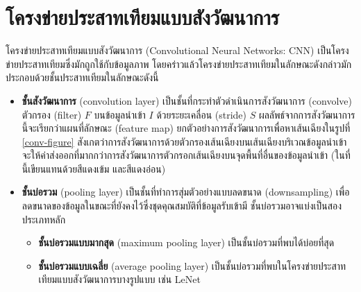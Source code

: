 \documentclass{cpereport}
\begin{document}
\section{โครงข่ายประสาทเทียมแบบสังวัฒนาการ}

โครงข่ายประสาทเทียมแบบสังวัฒนาการ (Convolutional Neural Networks: CNN) \cite{lecun-1998} เป็นโครงข่ายประสาทเทียมซึ่งมักถูกใช้กับข้อมูลภาพ \cite{Krizhevsky-2012} โดยคร่าวแล้วโครงข่ายประสาทเทียมในลักษณะดังกล่าวมักประกอบด้วยชั้นประสาทเทียมในลักษณะดังนี้

\begin{itemize}
    \item \textbf{ชั้นสังวัฒนาการ} (convolution layer) เป็นชั้นที่กระทำตัวดำเนินการสังวัฒนาการ (convolve) ตัวกรอง (filter) $F$ บนข้อมูลนำเข้า $I$ ด้วยระยะเคลื่อน (stride) $S$ ผลลัพธ์จากการสังวัฒนาการนี้จะเรียกว่าแผนที่ลักษณะ (feature map) ยกตัวอย่างการสังวัฒนาการเพื่อหาเส้นเฉียงในรูปที่ \ref{conv-figure} สังเกตว่าการสังวัฒนาการด้วยตัวกรองเส้นเฉียงบนเส้นเฉียงบริเวณข้อมูลนำเข้า จะให้ค่าส่งออกที่มากกว่าการสังวัฒนาการตัวกรอกเส้นเฉียงบนจุดพื้นที่อื่นของข้อมูลนำเข้า (ในที่นี้เขียนแทนด้วยสีแดงเข้ม และสีแดงอ่อน)
    \item \textbf{ชั้นบ่อรวม} (pooling layer)
    เป็นชั้นที่ทำการสุ่มตัวอย่างแบบลดขนาด (downsampling) เพื่อลดขนาดของข้อมูลในขณะที่ยังคงไว้ซึ่งชุดคุณสมบัติที่ข้อมูลรับเข้ามี ชั้นบ่อรวมอาจแบ่งเป็นสองประเภทหลัก
    \begin{itemize} 
        \item \textbf{ชั้นบ่อรวมแบบมากสุด} (maximum pooling layer) เป็นชั้นบ่อรวมที่พบได้บ่อยที่สุด
        \item \textbf{ชั้นบ่อรวมแบบเฉลี่ย} (average pooling layer) เป็นชั้นบ่อรวมที่พบในโครงข่ายประสาทเทียมแบบสังวัฒนาการบางรูปแบบ เช่น LeNet
    \end{itemize}
\end{itemize}
\end{document}
